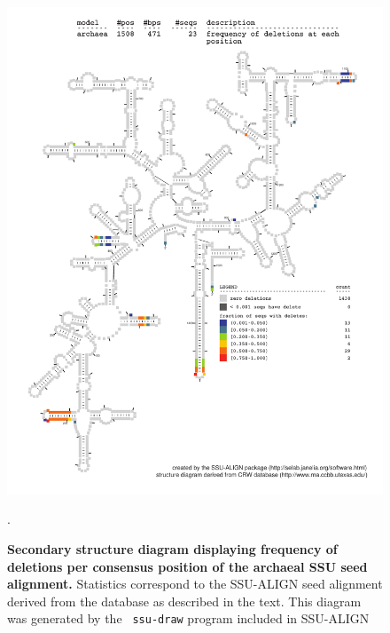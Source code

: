 \begin{figure}
\begin{center}
\includegraphics[width=5.7in]{Figures/archaea-0p1-dall}
\end{center}
\caption[Secondary structure diagram displaying frequency of deletions
  per consensus position of the archaeal SSU seed
  alignment]{\textbf{Secondary structure diagram displaying frequency 
  of deletions per consensus position of the archaeal SSU seed
  alignment.} Statistics correspond to the SSU-ALIGN seed
  alignment derived from the  database \cite{CannoneGutell02}
  as described in the text. This diagram was generated by the {\tt
  ssu-draw} program included in SSU-ALIGN}.
\label{fig:arcdel}
\end{figure}

\newpage 

